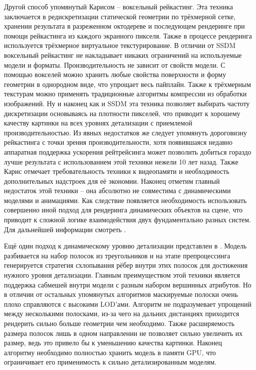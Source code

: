 \documentclass[12pt]{extarticle}
\begin{document}
Другой способ упомянутый Карисом -- воксельный рейкастинг. Эта техника заключается в редискретизации статической геометрии по трёхмерной сетке, хранении результата в разреженном октодереве и последующем рендеринге при помощи рейкастинга из каждого экранного пикселя. Также в процессе рендеринга используется трёхмерное виртуальное текстурирование. В отличии от SSDM воксельный рейкастинг не накладывает никаких ограничений на используемые модели и форматы. Производительность не зависит от свойств модели. С помощью вокселей можно хранить любые свойства поверхности и форму геометрии в однородном виде, что упрощает весь пайплайн. Также к трёхмерным текстурам можно применять традиционные алгоритмы компрессии из обработки изображений. Ну и наконец как и SSDM эта техника позволяет выбирать частоту дискретизации основываясь на плотности пикселей, что приводит к хорошему качеству картинки на всех уровнях детализации с приемлемой производительностью. Из явных недостатков же следует упомянуть дороговизну рейкастинга с точки зрения производительности, хотя появившаяся недавно аппаратная поддержка ускорения рейтрейсинга может позволить добиться гораздо лучше результата с использованием этой техники нежели 10 лет назад. Также Карис отмечает требовательность техники к видеопамяти и необходимость дополнительных надстроек для её экономии. Наконец отметим главный недостаток этой техники -- она абсолютно не совместима с динамическими моделями и анимациями. Как следствие появляется необходимость использовать совершенно иной подход для рендеринга динамических объектов на сцене, что приводит к сложной логике взаимодействия двух фундаментально разных систем. Для дальнейшей информации смотреть \cite{cur_and_next_parallelism}.

Ещё один подход к динамическому уровню детализации представлен в \cite{RIPOLLES2009184}. Модель разбивается на набор полосок из треугольников и на этапе препроцессинга генерируется стратегия схлопывания рёбер внутри этих полосок для достижения нужного уровня детализации. Главным преимуществом этой техники является поддержка сабмешей внутри модели с разным набором вершинных атрибутов. Но в отличии от остальных упомянутых алгоритмов маскируемые полоски очень плохо справляются с высокими LOD'ами. Алгоритм не подразумевает упрощений между несколькими полосками, из-за чего на дальних дистанциях приходится рендерить сильно больше геометрии чем необходимо. Также расширяемость размера полосок лишь в одном направлении не позволяет сильно увеличить их размер, ведь это привело бы к уменьшению качества картинки. Наконец алгоритму необходимо полностью хранить модель в памяти GPU, что ограничивает его применимость к сильно детализированным моделям.
\end{document}
